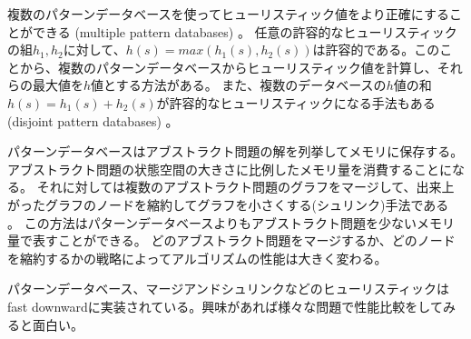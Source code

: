 複数のパターンデータベースを使ってヒューリスティック値をより正確にすることができる (multiple pattern databases) \cite{holte2004multiple}。
任意の許容的なヒューリスティックの組$h_1, h_2$に対して、$h(s) = max(h_1(s), h_2(s))$は許容的である。このことから、複数のパターンデータベースからヒューリスティック値を計算し、それらの最大値を$h$値とする方法がある。
また、複数のデータベースの$h$値の和$h(s) = h_1(s) + h_2(s)$が許容的なヒューリスティックになる手法もある (disjoint pattern databases) \cite{korf2002}。

パターンデータベースはアブストラクト問題の解を列挙してメモリに保存する。
アブストラクト問題の状態空間の大きさに比例したメモリ量を消費することになる。
それに対しては複数のアブストラクト問題のグラフをマージして、出来上がったグラフのノードを縮約してグラフを小さくする(シュリンク)手法である \cite{helmert2014merge}。
この方法はパターンデータベースよりもアブストラクト問題を少ないメモリ量で表すことができる。
どのアブストラクト問題をマージするか、どのノードを縮約するかの戦略によってアルゴリズムの性能は大きく変わる。

パターンデータベース、マージアンドシュリンクなどのヒューリスティックはfast downwardに実装されている。興味があれば様々な問題で性能比較をしてみると面白い。


